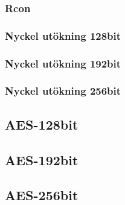\subsubsection{Rcon}
\label{sec:aes-rcon}


\subsubsection{Nyckel utökning 128bit}
\label{sec:aes-key-expansion-128bit}


\subsubsection{Nyckel utökning 192bit}
\label{sec:aes-key-expansion-192bit}


\subsubsection{Nyckel utökning 256bit}
\label{sec:aes-key-expansion-256bit}


\subsection{AES-128bit}
\label{sec:aes-128bit}


\subsection{AES-192bit}
\label{sec:aes-192bit}


\subsection{AES-256bit}
\label{sec:aes-256bit}


